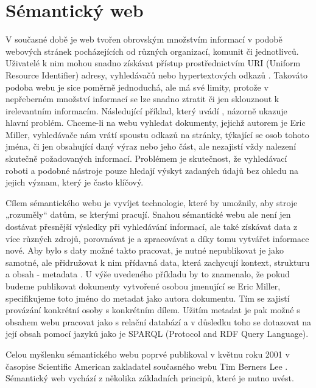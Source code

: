 \documentclass{projekt}
\begin{document}
\chapter{Sémantický web}
\hspace{0.65cm}V současné době je web tvořen obrovským množstvím informací v podobě webových stránek pocházejících od různých organizací, komunit či jednotlivců. Uživatelé k nim mohou snadno získávat přístup prostřednictvím URI (Uniform Resource Identifier) adresy, vyhledávačů nebo hypertextových odkazů \cite{dva}. Takováto podoba webu je sice poměrně jednoduchá, ale má své limity, protože v nepřeberném množství informací se lze snadno ztratit či jen sklouznout k irelevantním informacím. Následující příklad, který uvádí \cite{dva}, názorně ukazuje hlavní problém. Chceme-li na webu vyhledat dokumenty, jejichž autorem je Eric Miller, vyhledávače nám vrátí spoustu odkazů na stránky, týkající se osob tohoto jména, či jen obsahující daný výraz nebo jeho část, ale nezajistí vždy nalezení skutečně požadovaných informací. Problémem je skutečnost, že vyhledávací roboti a podobné nástroje pouze hledají výskyt zadaných údajů bez ohledu na jejich význam, který je často klíčový.


 Cílem sémantického webu je vyvíjet technologie, které by umožnily, aby stroje „rozuměly“ datům, se kterými pracují. Snahou sémantické webu ale není jen dostávat přesnější výsledky při vyhledávání informací, ale také získávat data z více různých zdrojů, porovnávat je a zpracovávat a díky tomu vytvářet informace nové. Aby bylo s daty možné takto pracovat, je nutné nepublikovat je jako samotné, ale přidružovat k nim přídavná data, která zachycují kontext, strukturu a obsah -  metadata \cite{dvacetDva}. U výše uvedeného příkladu by to znamenalo, že pokud budeme publikovat dokumenty vytvořené osobou jmenující se Eric Miller, specifikujeme toto jméno do metadat jako autora dokumentu. Tím se zajistí provázání konkrétní osoby s konkrétním dílem. Užitím metadat je pak možné s obsahem webu pracovat jako s relační databází a v důsledku toho se dotazovat na její obsah pomocí jazyků jako je SPARQL (Protocol and RDF Query Language).


Celou myšlenku sémantického webu poprvé publikoval v květnu roku 2001 v časopise Scientific American zakladatel současného webu Tim Berners Lee \cite{tri}.
Sémantický web vychází z několika základních principů, které je nutno uvést.
\end{document}
